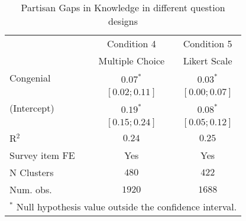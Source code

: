 \begin{table}
   \caption{Partisan Gaps in Knowledge in different question designs}
   \label{tab:mturk_hk}
\begin{center}
 \begin{tabular}{l c c}
\hline
   & Condition 4     & Condition 5 \\
   & Multiple Choice & Likert Scale \\
\hline
Congenial      & $0.07^{*}$      & $0.03^{*}$      \\
               & $ [0.02; 0.11]$ & $ [0.00; 0.07]$ \\
(Intercept)    & $0.19^{*}$      & $0.08^{*}$      \\
               & $ [0.15; 0.24]$ & $ [0.05; 0.12]$ \\
\hline
R$^2$          & $0.24$          & $0.25$          \\
Survey item FE & Yes             & Yes             \\
N Clusters     & $480$           & $422$           \\
Num. obs.      & $1920$          & $1688$          \\
\hline
\multicolumn{3}{l}{\scriptsize{$^*$ Null hypothesis value outside the confidence interval.}}
  \end{tabular}
\end{center}
\end{table}